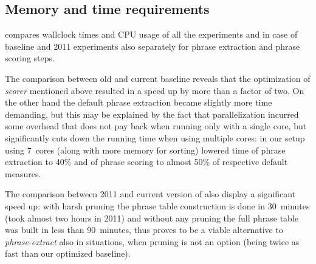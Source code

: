 \subsection{Memory and time requirements}


 compares wallclock times and CPU usage of all the
experiments and in case of baseline and 2011 experiments also separately for phrase
extraction and phrase scoring steps.

The comparison between old and current baseline reveals that the optimization of
\emph{scorer} mentioned above resulted in a speed up by more than a factor of two.
On the other hand the default phrase extraction became slightly more time demanding,
but this may be explained by the fact that parallelization incurred some overhead
that does not pay back when running only with a single core, but significantly cuts
down the running time when using multiple cores: in our setup using 7~cores (along with
more memory for sorting) lowered time of phrase extraction to 40\% and of phrase scoring
to almost 50\% of respective default measures.

The comparison between 2011 and current version of \eppex{} also display a significant
speed up: with harsh pruning the phrase table construction is done in 30~minutes (took
almost two hours in 2011) and without any pruning the full phrase table was built in
less than 90~minutes, thus \eppex{} proves to be a viable alternative to
\emph{phrase-extract} also in situations, when pruning is not an option (being twice as
fast than our optimized baseline).

